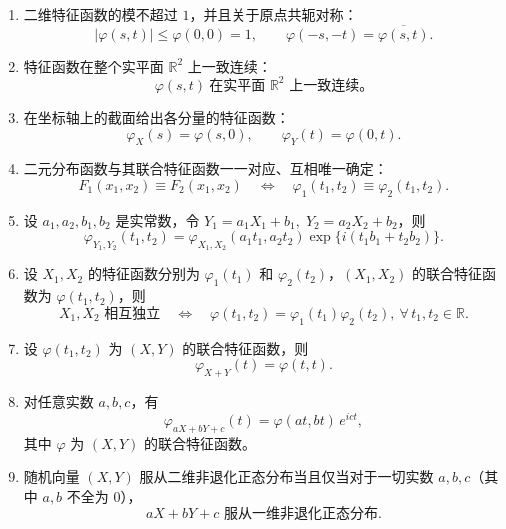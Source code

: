 \begin{proposition}[特征函数性质]
 \begin{enumerate}[1]
  \item 二维特征函数的模不超过 $1$，并且关于原点共轭对称：
  \[
    |\varphi(s,t)| \le \varphi(0,0) = 1,\qquad 
    \varphi(-s,-t) = \overline{\varphi(s,t)} .
  \]

  \item 特征函数在整个实平面 $\mathbb{R}^2$ 上一致连续：
  \[
    \varphi(s,t)\ \text{在实平面 } \mathbb{R}^2 \text{ 上一致连续。}
  \]

  \item 在坐标轴上的截面给出各分量的特征函数：
  \[
    \varphi_X(s) = \varphi(s,0),\qquad 
    \varphi_Y(t) = \varphi(0,t).
  \]

  \item 二元分布函数与其联合特征函数一一对应、互相唯一确定：
  \[
    F_1(x_1,x_2) \equiv F_2(x_1,x_2)
    \quad\Longleftrightarrow\quad
    \varphi_1(t_1,t_2) \equiv \varphi_2(t_1,t_2).
  \]
\end{enumerate}
\end{proposition}
\begin{enumerate}
  \setcounter{enumi}{4}  %

  \item 
  设 $a_1,a_2,b_1,b_2$ 是实常数，令 $Y_1=a_1X_1+b_1,\;Y_2=a_2X_2+b_2$，则
  \[
    \varphi_{Y_1,Y_2}(t_1,t_2)
    =\varphi_{X_1,X_2}(a_1t_1,a_2t_2)\exp\{i(t_1b_1+t_2b_2)\}.
  \]

  \item 
  设 $X_1,X_2$ 的特征函数分别为 $\varphi_1(t_1)$ 和 $\varphi_2(t_2)$，$(X_1,X_2)$ 的联合特征函数为 $\varphi(t_1,t_2)$，则
  \[
    X_1,X_2 \text{ 相互独立}
    \quad\Longleftrightarrow\quad
    \varphi(t_1,t_2)=\varphi_1(t_1)\varphi_2(t_2),\ \forall\,t_1,t_2\in\mathbb{R}.
  \]

  \item 
  设 $\varphi(t_1,t_2)$ 为 $(X,Y)$ 的联合特征函数，则
  \[
    \varphi_{X+Y}(t)=\varphi(t,t).
  \]

  \item 
  对任意实数 $a,b,c$，有
  \[
    \varphi_{aX+bY+c}(t)=\varphi(at,bt)\,e^{ict},
  \]
  其中 $\varphi$ 为 $(X,Y)$ 的联合特征函数。

  \item 
  随机向量 $(X,Y)$ 服从二维非退化正态分布当且仅当对于一切实数 $a,b,c$（其中 $a,b$ 不全为 $0$），
  \[
    aX+bY+c \text{ 服从一维非退化正态分布}.
  \]
\end{enumerate}
